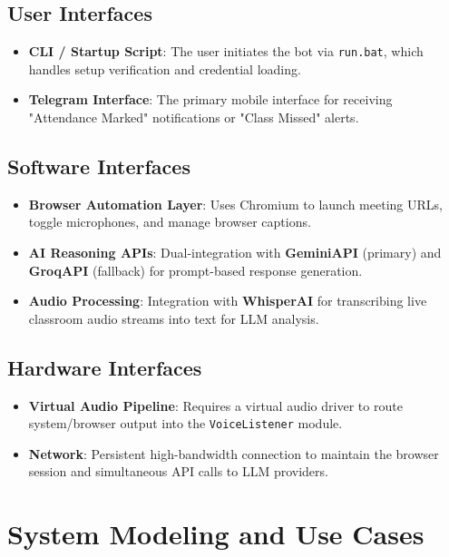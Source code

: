 \documentclass[12pt]{article}
\begin{document}
\subsection{User Interfaces}
\begin{itemize}
    \item \textbf{CLI / Startup Script}: The user initiates the bot via \texttt{run.bat}, which handles setup verification and credential loading.
    \item \textbf{Telegram Interface}: The primary mobile interface for receiving "Attendance Marked" notifications or "Class Missed" alerts.
\end{itemize}

\subsection{Software Interfaces}
\begin{itemize}
    \item \textbf{Browser Automation Layer}: Uses Chromium to launch meeting URLs, toggle microphones, and manage browser captions.
    \item \textbf{AI Reasoning APIs}: Dual-integration with \textbf{GeminiAPI} (primary) and \textbf{GroqAPI} (fallback) for prompt-based response generation.
    \item \textbf{Audio Processing}: Integration with \textbf{WhisperAI} for transcribing live classroom audio streams into text for LLM analysis.
\end{itemize}

\subsection{Hardware Interfaces}
\begin{itemize}
    \item \textbf{Virtual Audio Pipeline}: Requires a virtual audio driver to route system/browser output into the \texttt{VoiceListener} module.
    \item \textbf{Network}: Persistent high-bandwidth connection to maintain the browser session and simultaneous API calls to LLM providers.
\end{itemize}

\newpage

\newpage

\section{System Modeling and Use Cases}
\end{document}
